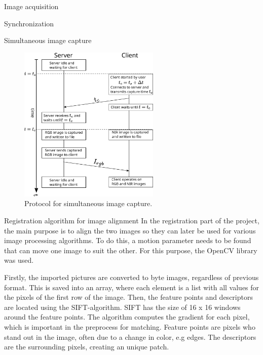 \documentclass[10pt]{article}
\begin{document}
\begin{section}{Image acquisition}
\begin{subsection}{Synchronization}
\begin{subsubsection}{Simultaneous image capture}
            \begin{figure}[!h]
                \begin{center}
                    \includegraphics[width=0.6\textwidth]{fig/client_server.eps}
                    \caption{Protocol for simultaneous image capture.}
                    \label{fig:client_server}
                \end{center}
            \end{figure}
        \end{subsubsection}

    \end{subsection} %

    \begin{subsection}{Registration algorithm for image alignment}
        \label{sec:image_registration}
        In the registration part of the project, the main purpose is to align the two images so they can later be used for various image processing algorithms. To do this, a motion parameter needs to be found that can move one image to suit the other. For this purpose, the OpenCV library was used.

        \medskip

        Firstly, the imported pictures are converted to byte images, regardless of previous format. This is saved into an array, where each element is a list with all values for the pixels of the first row of the image. Then, the feature points and descriptors are located using the SIFT-algorithm. SIFT has the size of 16 x 16 windows around the feature points. The algorithm computes the gradient for each pixel, which is important in the preprocess for matching. Feature points are pixels who stand out in the image, often due to a change in color, e.g edges. The descriptors are the surrounding pixels, creating an unique patch.


\end{subsection}
\end{section}
\end{document}
